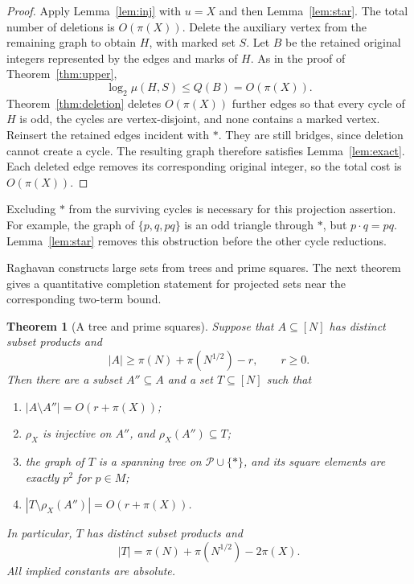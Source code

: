 \documentclass[11pt]{article}
\numberwithin{equation}{section}
\newtheorem{theorem}{Theorem}[section]
\theoremstyle{remark}
\begin{document}
\begin{proof}
Apply Lemma~\ref{lem:inj} with $u=X$ and then Lemma~\ref{lem:star}. The total number of deletions is $O(\pi(X))$. Delete the auxiliary vertex from the remaining graph to obtain $H$, with marked set $S$. Let $B$ be the retained original integers represented by the edges and marks of $H$. As in the proof of Theorem~\ref{thm:upper},
\[
\log_2\mu(H,S)\le Q(B)=O(\pi(X)).
\]
Theorem~\ref{thm:deletion} deletes $O(\pi(X))$ further edges so that every cycle of $H$ is odd, the cycles are vertex-disjoint, and none contains a marked vertex. Reinsert the retained edges incident with $*$. They are still bridges, since deletion cannot create a cycle. The resulting graph therefore satisfies Lemma~\ref{lem:exact}. Each deleted edge removes its corresponding original integer, so the total cost is $O(\pi(X))$.
\end{proof}

Excluding $*$ from the surviving cycles is necessary for this projection assertion. For example, the graph of $\{p,q,pq\}$ is an odd triangle through $*$, but $p\cdot q=pq$. Lemma~\ref{lem:star} removes this obstruction before the other cycle reductions.

Raghavan \cite[Example~5.1]{Raghavan} constructs large sets from trees and prime squares. The next theorem gives a quantitative completion statement for projected sets near the corresponding two-term bound.

\begin{theorem}[A tree and prime squares]\label{thm:tree}
Suppose that $A\subseteq[N]$ has distinct subset products and
\[
|A|\ge\pi(N)+\pi(N^{1/2})-r,\qquad r\ge0.
\]
Then there are a subset $A''\subseteq A$ and a set $T\subseteq[N]$ such that
\begin{enumerate}
\item $|A\setminus A''|=O(r+\pi(X))$;
\item $\rho_X$ is injective on $A''$, and $\rho_X(A'')\subseteq T$;
\item the graph of $T$ is a spanning tree on $\mathcal P\cup\{*\}$, and its square elements are exactly $p^2$ for $p\in M$;
\item $|T\setminus\rho_X(A'')|=O(r+\pi(X))$.
\end{enumerate}
In particular, $T$ has distinct subset products and
\[
|T|=\pi(N)+\pi(N^{1/2})-2\pi(X).
\]
All implied constants are absolute.
\end{theorem}
\end{document}
